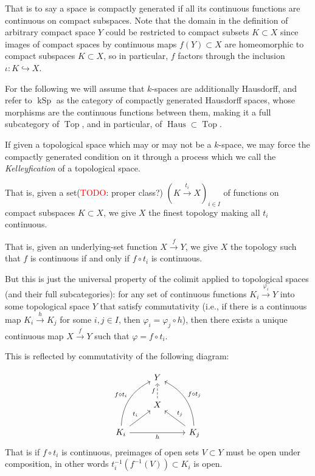 \documentclass[12pt,a4paper]{article}
\DeclareMathOperator{\Top}{Top}
\DeclareMathOperator{\kSp}{kSp}
\DeclareMathOperator{\Haus}{Haus}
\begin{document}
That is to say a space is compactly generated if all its continuous functions are continuous on compact subspaces. Note that the domain in the definition of arbitrary compact space $Y$ could be restricted to compact subsets $K \subset X$ since images of compact spaces by continuous maps $f(Y) \subset X$ are homeomorphic to compact subspaces  $K \subset X$, so in particular, $f$ factors through the inclusion $\iota: K \hookrightarrow X$. 

For the following we will assume that $k$-spaces are additionally Hausdorff, and refer to ${\kSp}$ as the category of compactly generated Hausdorff spaces, whose morphisms are the continuous functions between them, making it a full subcategory of $\Top$, and in particular, of $\Haus \subset \Top$. 

If given a topological space which may or may not be a $k$-space, we may force the compactly generated condition on it through a process which we call the \emph{Kelleyfication} of a topological space.

That is, given a set(\textcolor{red}{TODO}: proper class?) $(K \stackrel{t_i}{\to} X)_{i \in I}$ of functions on compact subspaces $K\subset X$, we give $X$ the finest topology making all $t_i$ continuous. 

That is, given an underlying-set function $X \stackrel{f}{\to} Y$, we give $X$ the topology such that $f$ is continuous if and only if $f \circ t_i$ is continuous. 

But this is just the universal property of the colimit applied to topological spaces (and their full subcategories): for any set of continuous functions  $K_i \stackrel{\varphi_i}{\to}Y$ into some topological space $Y$ that satisfy commutativity (i.e., if there is a continuous map $K_i \stackrel{h}{\to} K_j $ for some $i, j \in I$, then $\varphi_i = \varphi_j \circ h$), then there exists a unique continuous map $X \stackrel{f}{\to}Y$ such that $\varphi = f \circ t_i$. 

This is reflected by commutativity of the following diagram:

\[\begin{tikzcd}
	& Y \\
	& X \\
	{K_i} && {K_j}
	\arrow["f", dashed, from=2-2, to=1-2]
	\arrow["{f \circ t_i}", bend left,  from=3-1, to=1-2]
	\arrow["{t_i}", from=3-1, to=2-2]
	\arrow["h"', from=3-1, to=3-3]
	\arrow["{f \circ t_j}"', bend right, from=3-3,  to=1-2]
	\arrow["{t_j}"', from=3-3, to=2-2]
\end{tikzcd}\]
That is if $f \circ t_i$ is continuous, preimages of open sets $V \subset Y$ must be open under composition, in other words $t_i^{-1}(f^{-1}(V)) \subset K_i$ is open. 
\end{document}
